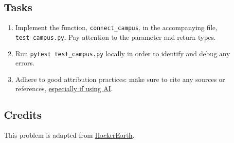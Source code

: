 \documentclass[a4paper]{exam}
\begin{document}
\begin{questions}
  \subsection*{Tasks}
  \begin{enumerate}
    \item Implement the function, \texttt{connect\_campus}, in the accompanying file, \texttt{test\_campus.py}. Pay attention to the parameter and return types.
    \item Run \texttt{pytest test\_campus.py} locally in order to identify and debug any errors.
    \item Adhere to good attribution practices: make sure to cite any sources or references, \href{https://hulms.instructure.com/courses/2616/discussion_topics/29240}{especially if using AI}.
  \end{enumerate}

  \subsection*{Credits}
  This problem is adapted from \href{https://www.hackerearth.com}{HackerEarth}.

\end{questions}
\end{document}
